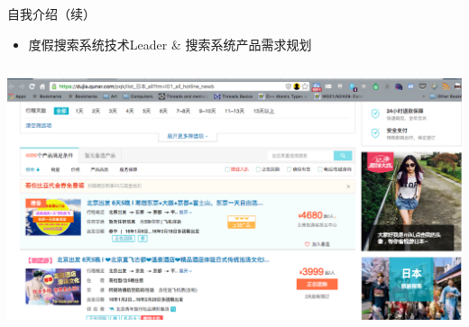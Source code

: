 \documentclass[handout]{beamer}
\begin{document}
\begin{CJK}{UTF8}{gbsn}
\begin{frame}{自我介绍（续）}
  \begin{itemize}
  \item {度假搜索系统技术Leader \& 搜索系统产品需求规划}
  \end{itemize}
  \vspace{3 mm}
  \begin{columns}
    \includegraphics[scale=0.15]{./images/pc-search-screenshot}

\end{columns}
\end{frame}
\end{CJK}
\end{document}
